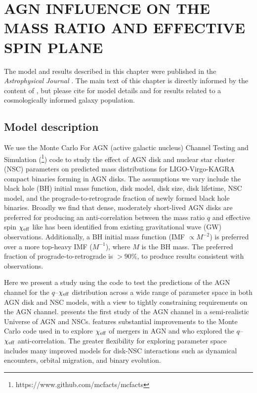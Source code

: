 \section{\texorpdfstring{\MakeUppercase{AGN influence on the mass ratio and effective spin plane}}{AGN influence on the mass ratio and effective spin plane}}
\label{sec:qXeff}


\par The model and results described in this chapter were published in the \textit{Astrophysical Journal} \citep{Cook+25}.
The main text of this chapter is directly informed by the content of \citet{Cook+25}, but please cite \citet{McKernan+25-mcfactsI} for model details and \citet{Delfavero+25-mcfactsIII} for results related to a cosmologically informed galaxy population.

\subsection{Model description}

We use the Monte Carlo For AGN (active galactic nucleus) Channel Testing and Simulation (\footnote{https://www.github.com/mcfacts/mcfacts}) code to study the effect of AGN disk and nuclear star cluster (NSC) parameters on predicted mass distributions for LIGO-Virgo-KAGRA compact binaries forming in AGN disks.
The assumptions we vary include the black hole (BH) initial mass function, disk model, disk size, disk lifetime, NSC model, and the prograde-to-retrograde fraction of newly formed black hole binaries.
Broadly we find that dense, moderately short-lived AGN disks are preferred for producing an anti-correlation between the mass ratio $q$ and effective spin $\chi_{\rm eff}$ like has been identified from existing gravitational wave (GW) observations.
Additionally, a BH initial mass function (IMF $\propto M^{-2}$) is preferred over a more top-heavy IMF ($M^{-1}$), where $M$ is the BH mass.
The preferred fraction of prograde-to-retrograde is $>90\%$, to produce results consistent with observations.

Here we present a study using the  code \citep[Monte Carlo For AGN Channel Testing and Simulations:][]{McKernan+25-mcfactsI} to test the predictions of the AGN channel for the $q$--$\chi_{\rm eff}$ distribution across a wide range of parameter space in both AGN disk and NSC models, with a view to tightly constraining requirements on the AGN channel.
\citet{Delfavero+25-mcfactsIII} presents the first study of the AGN channel in a semi-realistic Universe of AGN and NSCs.
 features substantial improvements to the Monte Carlo code used in \citet{McKernan+20a} to explore $\chi_{\rm eff}$ of mergers in AGN and \citet{McKernan+22:q-Xeff} who explored the $q$--$\chi_{\rm eff}$ anti-correlation.
The greater flexibility for exploring parameter space includes many improved models for disk-NSC interactions such as dynamical encounters, orbital migration, and binary evolution.


